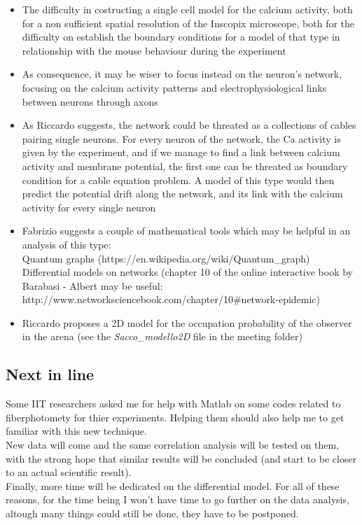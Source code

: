 \documentclass[a4paper]{article}
\begin{document}
	\begin{itemize}
		
		\item The difficulty in costructing a single cell model for the calcium activity, both for a non sufficient spatial resolution of the Inscopix microscope, both for the difficulty on establish the boundary conditions for a model of that type in relationship with the mouse behaviour during the experiment
		
		\item As consequence, it may be wiser to focus instead on the  neuron's network, focusing on the calcium activity patterns and electrophysiological links between neurons through axons
		
		\item As Riccardo suggests, the network could be threated as a collections of cables pairing single neurons. For every neuron of the network, the Ca activity is given by the experiment, and if we manage to find a link between calcium activity and membrane potential, the first one can be threated as boundary condition for a cable equation problem. A model of this type would then predict the potential drift along the network, and its link with the calcium activity for every single neuron
		
		\item Fabrizio suggests a couple of mathematical tools which may be helpful in an analysis of this type: \\
		Quantum graphs (https://en.wikipedia.org/wiki/Quantum\_graph) \\
		Differential models on networks (chapter 10 of the online interactive book by Barabasi - Albert may be useful: http://www.networksciencebook.com/chapter/10\#network-epidemic)
		
		\item Riccardo proposes a 2D model for the occupation probability of the observer in the arena (see the \textit{Sacco\_modello2D} file in the meeting folder)
		
		
		
	\end{itemize}
		
		
			\subsection{Next in line}
		
		Some IIT researchers asked me for help with Matlab on some codes related to fiberphotomety for thier experiments. Helping them should also help me to get familiar with this new technique. \\
		New data will come and the same correlation analysis will be tested on them, with the strong hope that similar results will be concluded (and start to be closer to an actual scientific result).\\
		Finally, more time will be dedicated on the differential model. For all of these reasons, for the time being I won't have time to go further on the data analysis, altough many things could still be done, they have to be postponed.
		
\end{document}

